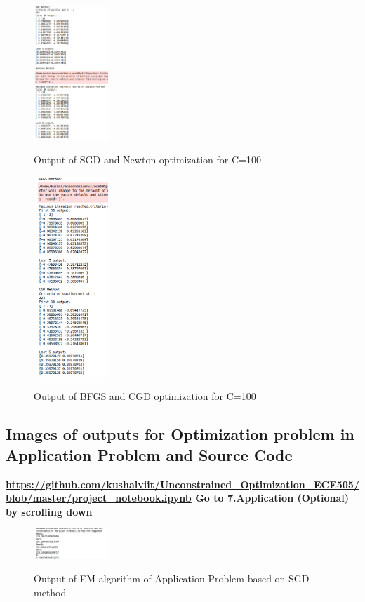 \documentclass[paper=a4, fontsize=11pt]{scrartcl}
\numberwithin{equation}{section}		%
\numberwithin{figure}{section}			%
\numberwithin{table}{section}				%
\begin{document}
\begin{figure}[H]
\caption{Output of SGD and Newton optimization for C=100}
\centering
\includegraphics[width=0.25\textwidth]{out15.png}
\label{out15}
\end{figure}
\begin{figure}[H]
\caption{Output of BFGS and CGD optimization for C=100}
\centering
\includegraphics[width=0.25\textwidth]{out16.png}
\label{out16}
\end{figure}
\subsection*{Images of outputs for Optimization problem in Application Problem and Source Code}
\textbf{\url{https://github.com/kushalviit/Unconstrained_Optimization_ECE505/blob/master/project_notebook.ipynb}
Go to 7.Application (Optional) by scrolling down}
\begin{figure}[H]
\caption{Output of EM algorithm of Application Problem based on SGD method}
\centering
\includegraphics[width=0.25\textwidth]{out18.png}
\label{out18}
\end{figure}
\end{document}
